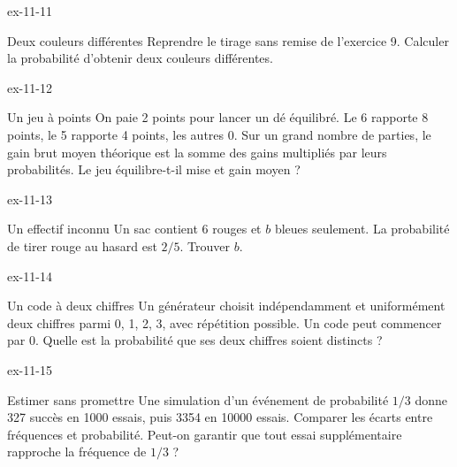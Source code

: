 \clearpage{}
\begin{blocLivre}{ex-11-11}\begin{exercice}[3]{Deux couleurs différentes}
Reprendre le tirage sans remise de l’exercice 9. Calculer la probabilité d’obtenir deux couleurs différentes.
\label{fig-ex-11-11}
\end{exercice}\end{blocLivre}
\begin{blocLivre}{ex-11-12}\begin{exercice}[3]{Un jeu à points}
On paie 2 points pour lancer un dé équilibré. Le 6 rapporte 8 points, le 5 rapporte 4 points, les autres 0. Sur un grand nombre de parties, le gain brut moyen théorique est la somme des gains multipliés par leurs probabilités. Le jeu équilibre-t-il mise et gain moyen ?
\end{exercice}\end{blocLivre}
\begin{blocLivre}{ex-11-13}\begin{exercice}[3]{Un effectif inconnu}
Un sac contient 6 rouges et $b$ bleues seulement. La probabilité de tirer rouge au hasard est $2/5$. Trouver $b$.
\end{exercice}\end{blocLivre}
\begin{blocLivre}{ex-11-14}\begin{exercice}[3]{Un code à deux chiffres}
Un générateur choisit indépendamment et uniformément deux chiffres parmi 0, 1, 2, 3, avec répétition possible. Un code peut commencer par 0. Quelle est la probabilité que ses deux chiffres soient distincts ?
\end{exercice}\end{blocLivre}
\begin{blocLivre}{ex-11-15}\begin{exercice}[3]{Estimer sans promettre}
Une simulation d’un événement de probabilité $1/3$ donne 327 succès en 1000 essais, puis 3354 en 10000 essais. Comparer les écarts entre fréquences et probabilité. Peut-on garantir que tout essai supplémentaire rapproche la fréquence de $1/3$ ?
\end{exercice}\end{blocLivre}

\clearpage
